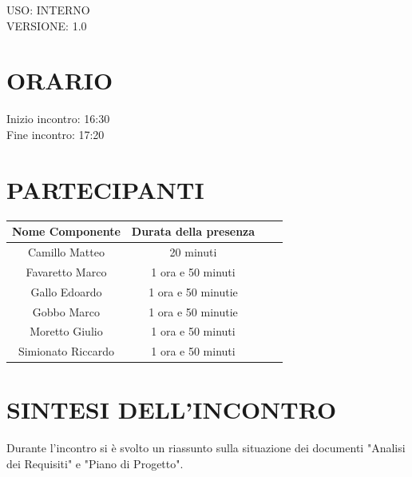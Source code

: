 \documentclass[5pt]{article}
\begin{document}
\begin{flushright}
    \begin{spacing}{1}
        USO: INTERNO\\
        VERSIONE: 1.0\\ %
    \end{spacing}
\end{flushright}


\restoregeometry

\pagebreak






\section{\Large ORARIO}
\begin{spacing}{1.5}
    {\large Inizio incontro: 16:30}\\
    {\large Fine incontro: 17:20}
\end{spacing}

\section{PARTECIPANTI}
\setlength\cellspacetoplimit{6pt}
\setlength\cellspacebottomlimit{6pt}

\begin{table}[ht]
  \begin{tabular}{|Sc|Sc|}
    \hline
    \textbf{Nome Componente} & \textbf{Durata della presenza} \\
    \hline
    Camillo Matteo & 20 minuti \\
    Favaretto Marco & 1 ora e 50 minuti \\
    Gallo Edoardo & 1 ora e 50 minutie \\
    Gobbo Marco & 1 ora e 50 minutie \\
    Moretto Giulio & 1 ora e 50 minuti \\
    Simionato Riccardo & 1 ora e 50 minuti \\
    \hline
  \end{tabular}
  \label{tab:conference}
\end{table}

\section{SINTESI DELL'INCONTRO}
Durante l'incontro si è svolto un riassunto sulla situazione dei documenti "Analisi dei Requisiti" e "Piano di Progetto".
\end{document}

